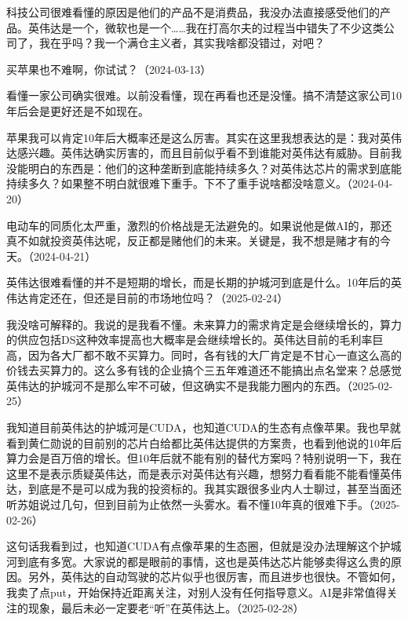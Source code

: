 科技公司很难看懂的原因是他们的产品不是消费品，我没办法直接感受他们的产品。英伟达是一个，微软也是一个……我在打高尔夫的过程当中错失了不少这类公司了，我在乎吗？我一个满仓主义者，其实我啥都没错过，对吧？


买苹果也不难啊，你试试？（2024-03-13）

看懂一家公司确实很难。以前没看懂，现在再看也还是没懂。搞不清楚这家公司10年后会是更好还是不如现在。

苹果我可以肯定10年后大概率还是这么厉害。其实在这里我想表达的是：我对英伟达感兴趣。英伟达确实厉害的，而且目前似乎看不到谁能对英伟达有威胁。目前我没能明白的东西是：他们的这种垄断到底能持续多久？对英伟达芯片的需求到底能持续多久？如果整不明白就很难下重手。下不了重手说啥都没啥意义。（2024-04-20）


电动车的同质化太严重，激烈的价格战是无法避免的。如果说他是做AI的，那还真不如就投资英伟达呢，反正都是赌他们的未来。关键是，我不想是赌才有的今天。（2024-04-21）

英伟达很难看懂的并不是短期的增长，而是长期的护城河到底是什么。10年后的英伟达肯定还在，但还是目前的市场地位吗？（2025-02-24）


我没啥可解释的。我说的是我看不懂。未来算力的需求肯定是会继续增长的，算力的供应包括DS这种效率提高也大概率是会继续增长的。英伟达目前的毛利率巨高，因为各大厂都不敢不买算力。同时，各有钱的大厂肯定是不甘心一直这么高的价钱去买算力的。这么多有钱的企业搞个三五年难道还不能搞出点名堂来？总感觉英伟达的护城河不是那么牢不可破，但这确实不是我能力圈内的东西。（2025-02-25）

我知道目前英伟达的护城河是CUDA，也知道CUDA的生态有点像苹果。我也早就看到黄仁勋说的目前别的芯片白给都比英伟达提供的方案贵，也看到他说的10年后算力会是百万倍的增长。但10年后就不能有别的替代方案吗？特别说明一下，我在这里不是表示质疑英伟达，而是表示对英伟达有兴趣，想努力看看能不能看懂英伟达，到底是不是可以成为我的投资标的。我其实跟很多业内人士聊过，甚至当面还听苏姐说过几句，但到目前为止依然一头雾水。看不懂10年真的很难下手。（2025-02-26）


这句话我看到过，也知道CUDA有点像苹果的生态圈，但就是没办法理解这个护城河到底有多宽。大家说的都是眼前的事情，这也是英伟达芯片能够卖得这么贵的原因。另外，英伟达的自动驾驶的芯片似乎也很厉害，而且进步也很快。不管如何，我卖了点put，开始保持近距离关注，对别人没有任何指导意义。AI是非常值得关注的现象，最后未必一定要老“听”在英伟达上。（2025-02-28）

